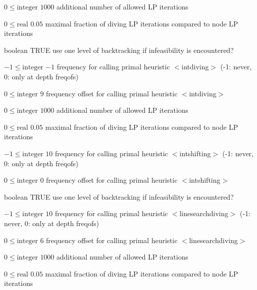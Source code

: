 %
{$0\leq\textrm{integer}$}%
{$1000$}%
{additional number of allowed LP iterations}%
{}

%
{$0\leq\textrm{real}$}%
{$0.05$}%
{maximal fraction of diving LP iterations compared to node LP iterations}%
{}

%
{boolean}%
{TRUE}%
{use one level of backtracking if infeasibility is encountered?}%
{}

%
{$-1\leq\textrm{integer}$}%
{$-1$}%
{frequency for calling primal heuristic $<$intdiving$>$ (-1: never, 0: only at depth freqofs)}%
{}

%
{$0\leq\textrm{integer}$}%
{$9$}%
{frequency offset for calling primal heuristic $<$intdiving$>$}%
{}

%
{$0\leq\textrm{integer}$}%
{$1000$}%
{additional number of allowed LP iterations}%
{}

%
{$0\leq\textrm{real}$}%
{$0.05$}%
{maximal fraction of diving LP iterations compared to node LP iterations}%
{}

%
{$-1\leq\textrm{integer}$}%
{$10$}%
{frequency for calling primal heuristic $<$intshifting$>$ (-1: never, 0: only at depth freqofs)}%
{}

%
{$0\leq\textrm{integer}$}%
{$0$}%
{frequency offset for calling primal heuristic $<$intshifting$>$}%
{}

%
{boolean}%
{TRUE}%
{use one level of backtracking if infeasibility is encountered?}%
{}

%
{$-1\leq\textrm{integer}$}%
{$10$}%
{frequency for calling primal heuristic $<$linesearchdiving$>$ (-1: never, 0: only at depth freqofs)}%
{}

%
{$0\leq\textrm{integer}$}%
{$6$}%
{frequency offset for calling primal heuristic $<$linesearchdiving$>$}%
{}

%
{$0\leq\textrm{integer}$}%
{$1000$}%
{additional number of allowed LP iterations}%
{}

%
{$0\leq\textrm{real}$}%
{$0.05$}%
{maximal fraction of diving LP iterations compared to node LP iterations}%
{}

